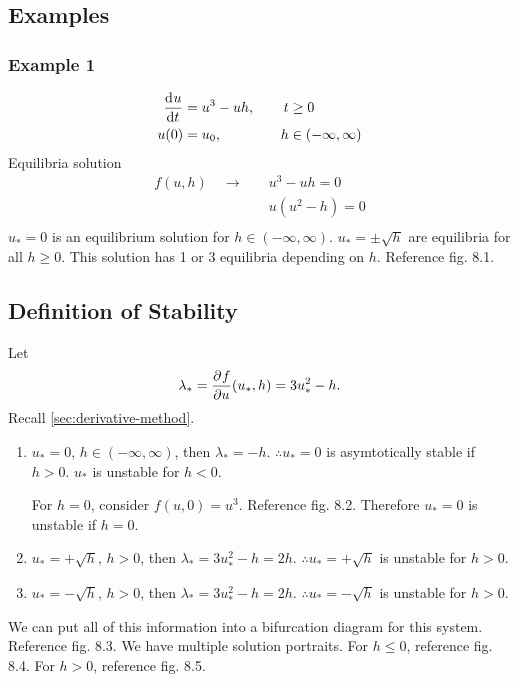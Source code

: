 \documentclass[12pt,twoside]{article}
\begin{document}
\subsection{Examples}
\subsubsection*{Example 1}
\begin{equation}
  \begin{aligned}
    \frac{\mathrm{d}^{} {u}}{\mathrm{d}{t}^{}} &= u^3-uh, &\quad t&\ge0 \\
    u(0) &= u_0, &\quad h&\in(-\infty,\infty) \\
  \end{aligned}
\end{equation}
Equilibria solution
\begin{equation}
  \begin{aligned}
    f(u,h) \quad \rightarrow \quad & u^3-uh=0 \\
    & u(u^2-h)=0 \\
  \end{aligned}
\end{equation}
$u_*=0$ is an equilibrium solution for $h\in(-\infty,\infty)$. $u_*=\pm\sqrt{h}$
are equilibria for all $h\ge0$. This solution has 1 or 3 equilibria depending on
$h$. Reference fig. 8.1.

\subsection{Definition of Stability}
Let $$\lambda_*=\frac{\partial^{} {f}}{\partial {u}^{}}(u_*,h)=3u_*^2-h.$$ Recall
\cref{sec:derivative-method}.

\begin{enumerate}
\item $u_*=0$, $h\in(-\infty,\infty)$, then $\lambda_*=-h$.
  $\therefore u_*=0$ is asymtotically stable if $h>0$.
  $u_*$ is unstable for $h<0$.

  For $h=0$, consider $f(u,0)=u^3$. Reference fig. 8.2. Therefore $u_*=0$ is
  unstable if $h=0$.
\item $u_*=+\sqrt{h},\, h>0$, then $\lambda_*=3u_*^2-h=2h$.
  $\therefore u_*=+\sqrt{h}$ is unstable for $h>0$.
\item $u_*=-\sqrt{h},\, h>0$, then $\lambda_*=3u_*^2-h=2h$.
  $\therefore u_*=-\sqrt{h}$ is unstable for $h>0$.
\end{enumerate}

We can put all of this information into a bifurcation diagram for this system.
Reference fig. 8.3. We have multiple solution portraits. For $h\le0$, reference
fig. 8.4. For $h>0$, reference fig. 8.5.
\end{document}
